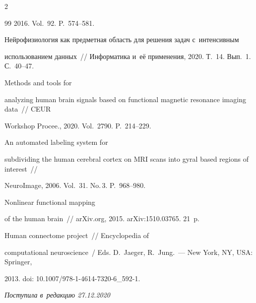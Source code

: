 \begin{multicols}{2}
{{\begin{thebibliography}{99}
2016. Vol.~92. P.~574--581.



Нейрофизиология как предметная область для решения задач с~интенсивным 

использованием данных~// Информатика и~её применения, 2020. Т.~14. Вып.~1. С.~40--47.


   Methods and tools for 

analyzing human brain signals based on functional magnetic resonance imaging data~// CEUR 

Workshop Procee., 2020. Vol.~2790. P.~214--229.


   An automated labeling system for 

subdividing the human cerebral cortex on MRI scans into gyral based regions of interest~// 

NeuroImage, 2006. Vol.~31. No.\,3. P.~968--980.


   Nonlinear functional mapping 

of the human brain~// arXiv.org, 2015. arXiv:1510.03765. 21~p.


   Human connectome project~// Encyclopedia of 

computational neuroscience~/ Eds. D.~Jaeger, R.~Jung.~--- New York, NY, USA: Springer, 

2013. doi: 10.1007/978-1-4614-7320-6\_592-1.

\end{thebibliography}



}

}



\end{multicols}



\vspace*{-6pt}



\hfill{\small\textit{Поступила в~редакцию 27.12.2020}}



